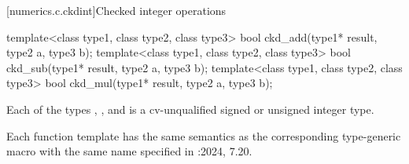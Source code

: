 [numerics.c.ckdint]{Checked integer operations}

%
%
%
\begin{itemdecl}
template<class type1, class type2, class type3>
  bool ckd_add(type1* result, type2 a, type3 b);
template<class type1, class type2, class type3>
  bool ckd_sub(type1* result, type2 a, type3 b);
template<class type1, class type2, class type3>
  bool ckd_mul(type1* result, type2 a, type3 b);
\end{itemdecl}

\begin{itemdescr}
\pnum
\mandates
Each of the types , , and  is a
cv-unqualified signed or unsigned integer type.

\pnum
\remarks
Each function template has the same semantics as
the corresponding type-generic macro with the same name
specified in \IsoCUndated{}:2024, 7.20.
\end{itemdescr}
